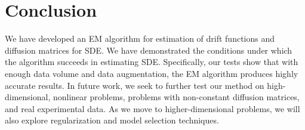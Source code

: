 \documentclass{article}
\begin{document}
\section{Conclusion} We have developed an EM algorithm for estimation of drift functions and diffusion matrices for SDE.  We have demonstrated the conditions under which the algorithm succeeds in estimating SDE.  Specifically, our tests show that with enough data volume and data augmentation, the EM algorithm produces highly accurate results.  In future work, we seek to further test our method on high-dimensional, nonlinear problems, problems with non-constant diffusion matrices, and real experimental data.  As we move to higher-dimensional problems, we will also explore regularization and model selection techniques.

\clearpage

{\small


}
\end{document}
